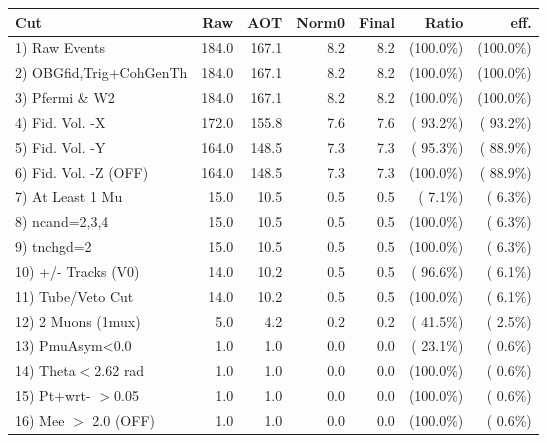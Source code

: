  \begin{table}[h!]\centering
 \begin{tabular}{||l||r|r|r|r|r|r||}
 \hline
 \hline
 Cut & Raw & AOT & Norm0 & Final & Ratio & eff.       \\
 \hline
  1) Raw Events           &        184.0 &        167.1 &          8.2 &          8.2 & (100.0\%) & (100.0\%) \\
  2) OBGfid,Trig+CohGenTh &        184.0 &        167.1 &          8.2 &          8.2 & (100.0\%) & (100.0\%) \\
  3) Pfermi \& W2         &        184.0 &        167.1 &          8.2 &          8.2 & (100.0\%) & (100.0\%) \\
  4) Fid. Vol. -X         &        172.0 &        155.8 &          7.6 &          7.6 & ( 93.2\%) & ( 93.2\%) \\
  5) Fid. Vol. -Y         &        164.0 &        148.5 &          7.3 &          7.3 & ( 95.3\%) & ( 88.9\%) \\
  6) Fid. Vol. -Z (OFF)   &        164.0 &        148.5 &          7.3 &          7.3 & (100.0\%) & ( 88.9\%) \\
  7) At Least 1 Mu        &         15.0 &         10.5 &          0.5 &          0.5 & (  7.1\%) & (  6.3\%) \\
  8) ncand=2,3,4          &         15.0 &         10.5 &          0.5 &          0.5 & (100.0\%) & (  6.3\%) \\
  9) tnchgd=2             &         15.0 &         10.5 &          0.5 &          0.5 & (100.0\%) & (  6.3\%) \\
 10) +/- Tracks (V0)      &         14.0 &         10.2 &          0.5 &          0.5 & ( 96.6\%) & (  6.1\%) \\
 11) Tube/Veto Cut        &         14.0 &         10.2 &          0.5 &          0.5 & (100.0\%) & (  6.1\%) \\
 12) 2 Muons (1mux)       &          5.0 &          4.2 &          0.2 &          0.2 & ( 41.5\%) & (  2.5\%) \\
 13) PmuAsym<0.0          &          1.0 &          1.0 &          0.0 &          0.0 & ( 23.1\%) & (  0.6\%) \\
 14) Theta$<$2.62 rad     &          1.0 &          1.0 &          0.0 &          0.0 & (100.0\%) & (  0.6\%) \\
 15) Pt+wrt- $>$0.05      &          1.0 &          1.0 &          0.0 &          0.0 & (100.0\%) & (  0.6\%) \\
 16) Mee $>$ 2.0  (OFF)   &          1.0 &          1.0 &          0.0 &          0.0 & (100.0\%) & (  0.6\%) \\

\end{tabular}
\end{table}
